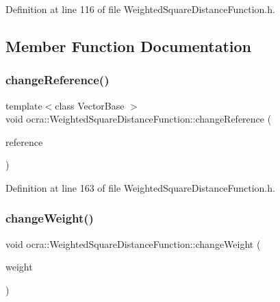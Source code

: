 Definition at line 116 of file Weighted\+Square\+Distance\+Function.\+h.



\subsection{Member Function Documentation}
\hypertarget{classocra_1_1WeightedSquareDistanceFunction_a6a81acd002eb8f7576b0c9ee99e1bc46}{}\label{classocra_1_1WeightedSquareDistanceFunction_a6a81acd002eb8f7576b0c9ee99e1bc46} 
\subsubsection{\texorpdfstring{change\+Reference()}{changeReference()}}
{\footnotesize\ttfamily template$<$class Vector\+Base $>$ \\
void ocra\+::\+Weighted\+Square\+Distance\+Function\+::change\+Reference (\begin{DoxyParamCaption}\item[{const Vector\+Base \&}]{reference }\end{DoxyParamCaption})\hspace{0.3cm}{\ttfamily [inline]}}



Definition at line 163 of file Weighted\+Square\+Distance\+Function.\+h.

\hypertarget{classocra_1_1WeightedSquareDistanceFunction_aa46e440abf19590ebdc4b72b97c9901d}{}\label{classocra_1_1WeightedSquareDistanceFunction_aa46e440abf19590ebdc4b72b97c9901d} 
\subsubsection{\texorpdfstring{change\+Weight()}{changeWeight()}\hspace{0.1cm}{\footnotesize\ttfamily [1/2]}}
{\footnotesize\ttfamily void ocra\+::\+Weighted\+Square\+Distance\+Function\+::change\+Weight (\begin{DoxyParamCaption}\item[{double}]{weight }\end{DoxyParamCaption})}



